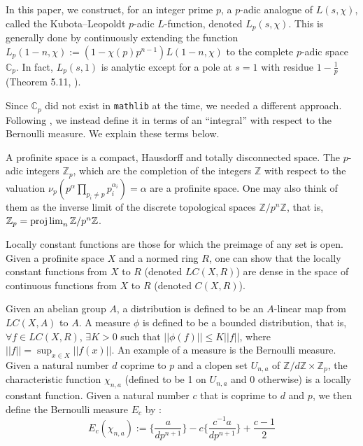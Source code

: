 \documentclass[a4paper,UKenglish,cleveref, autoref, thm-restate]{lipics-v2021}
\newcommand{\lean}[1]{\texttt{#1}\xspace} %
\begin{document}
In this paper, we construct, for an integer prime $p$, a $p$-adic analogue of $L(s, \chi)$, 
called the Kubota--Leopoldt $p$-adic $L$-function, denoted $L_p(s, \chi)$. This is generally done by continuously extending the function 
$L_p(1 - n, \chi) := (1 - \chi (p) p^{n - 1}) L(1 - n, \chi)$ to the complete $p$-adic space 
$\mathbb{C}_p$. In fact, $L_p(s, 1)$ is analytic except for a pole at $s = 1$ with residue 
$1 - \frac{1}{p}$ (Theorem 5.11, \cite{cyc}). 

Since $\mathbb{C}_p$ did not exist in \lean{mathlib} at the time, we needed a different approach. Following \cite{cyc}, 
we instead define it in terms of an ``integral'' with respect to the Bernoulli measure. We explain these terms below. 

A profinite space is a compact, Hausdorff and totally disconnected space. The $p$-adic integers 
$\mathbb{Z}_p$, which are the completion of the integers $\mathbb{Z}$ with respect to the 
valuation $\nu_p(p^{\alpha} \prod_{p_i \ne p} p_i^{\alpha_i}) = \alpha$ are a profinite space. 
One may also think of them as the inverse limit of the discrete topological spaces 
$\mathbb{Z} / p^{n} \mathbb{Z}$, that is, $\mathbb{Z}_p = \projlim_{n} \mathbb{Z} / p^{n} \mathbb{Z}$. 

Locally constant functions are those for which the preimage of any set is open. Given a profinite space $X$ and a normed ring $R$, 
one can show that the locally constant functions from $X$ to $R$ (denoted $LC(X, R)$) are dense in the space of continuous 
functions from $X$ to $R$ (denoted $C(X, R)$).

Given an abelian group $A$, a distribution is defined to be an $A$-linear map from $LC(X, A)$ 
to $A$. A measure $\phi$ is defined to be a bounded distribution, that is, $\forall f \in LC(X, R)$, 
$\exists K > 0$ such that $|| \phi (f) || \le K ||f|| $, where $||f|| = \sup_{x \in X} || f(x)||$. 
An example of a measure is the Bernoulli measure. Given a natural number $d$ coprime to $p$ and a clopen set $U_{n, a}$ of 
$\mathbb{Z}/ d \mathbb{Z} \times \mathbb{Z}_p$, the characteristic function $\chi_{n, a}$ 
(defined to be 1 on $U_{n, a}$ and 0 otherwise) is a locally constant function. 
Given a natural number $c$ that is coprime to $d$ and $p$, we then define the Bernoulli measure $E_c$ by :
$$ E_c(\chi_{n, a}) := \bigg \{ \frac{a}{d p^{n + 1}} \bigg \} - c \bigg \{ \frac{c^{-1} a}{d p^{n + 1}} \bigg \} + \frac{c - 1}{2} $$
\end{document}
